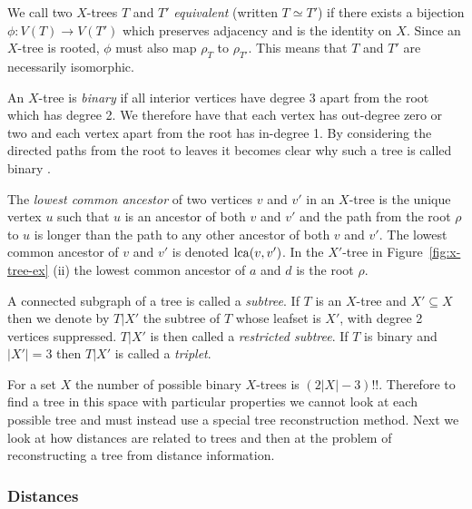 We call two $X$-trees $T$ and $T'$ \textit{equivalent} (written $T \simeq T'$)
if there exists a bijection $\phi \colon V(T) \to V(T')$ which preserves
adjacency and is the identity on $X$.  Since an $X$-tree is rooted, $\phi$
must also map $\rho_{T}$ to $\rho_{T'}$.  This means that $T$ and $T'$ are
necessarily isomorphic.

An $X$-tree is \textit{binary} if all interior vertices have degree 3 apart
from the root which has degree 2.  We therefore have that each vertex has
out-degree zero or two and each vertex apart from the root has in-degree 1.
By considering the directed paths from the root to leaves it becomes clear why
such a tree is called binary \cite{semple2003phylogenetics}.

The \textit{lowest common ancestor} of two vertices $v$ and $v'$ in an
$X$-tree is the unique vertex $u$ such that $u$ is an ancestor of both $v$ and
$v'$ and the path from the root $\rho$ to $u$ is longer than the path to any
other ancestor of both $v$ and $v'$.  The lowest common ancestor of $v$ and
$v'$ is denoted $\operatorname{lca}(v,v')$.  In the $X'$-tree in Figure~\ref{fig:x-tree-ex}
(ii) the lowest common ancestor of $a$ and $d$ is the root $\rho$.

A connected subgraph of a tree is called a \textit{subtree}.  If $T$ is an
$X$-tree and $X' \subseteq X$ then we denote by $T|X'$ the subtree of $T$
whose leafset is $X'$, with degree 2 vertices suppressed.  $T|X'$ is then
called a \textit{restricted subtree}.  If $T$ is binary and $|X'| = 3$ then
$T|X'$ is called a \textit{triplet}.

For a set $X$ the number of possible binary $X$-trees is $(2|X|-3)!!$.
Therefore to find a tree in this space with particular properties we cannot
look at each possible tree and must instead use a special tree reconstruction
method.  Next we look at how distances are related to trees and then at the
problem of reconstructing a tree from distance information.

\subsubsection{Distances}
\label{sec:distances}

